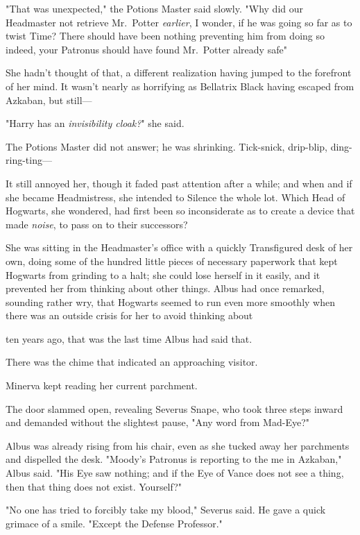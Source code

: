 "That was unexpected," the Potions Master said slowly. "Why did our Headmaster
not retrieve Mr.~Potter \emph{earlier}, I wonder, if he was going so far as to
twist Time? There should have been nothing preventing him from doing so{\el}
indeed, your Patronus should have found Mr.~Potter already safe{\el}"

She hadn't thought of that, a different realization having jumped to the
forefront of her mind. It wasn't nearly as horrifying as Bellatrix Black having
escaped from Azkaban, but still\mbox{---}

"Harry has an \emph{invisibility cloak?}" she said.

The Potions Master did not answer; he was shrinking.
\sbreak
Tick-snick, drip-blip, ding-ring-ting\mbox{---}

It still annoyed her, though it faded past attention after a while; and when
and if she became Headmistress, she intended to Silence the whole lot. Which
Head of Hogwarts, she wondered, had first been so inconsiderate as to create a
device that made \emph{noise}, to pass on to their successors?

She was sitting in the Headmaster's office with a quickly Transfigured desk of
her own, doing some of the hundred little pieces of necessary paperwork that
kept Hogwarts from grinding to a halt; she could lose herself in it easily, and
it prevented her from thinking about other things. Albus had once remarked,
sounding rather wry, that Hogwarts seemed to run even more smoothly when there
was an outside crisis for her to avoid thinking about{\el}

{\el} ten years ago, that was the last time Albus had said that.

There was the chime that indicated an approaching visitor.

Minerva kept reading her current parchment.

The door slammed open, revealing Severus Snape, who took three steps inward and
demanded without the slightest pause, "Any word from Mad-Eye?"

Albus was already rising from his chair, even as she tucked away her parchments
and dispelled the desk. "Moody's Patronus is reporting to the me in Azkaban,"
Albus said. "His Eye saw nothing; and if the Eye of Vance does not see a thing,
then that thing does not exist. Yourself?"

"No one has tried to forcibly take my blood," Severus said. He gave a quick
grimace of a smile. "Except the Defense Professor."

